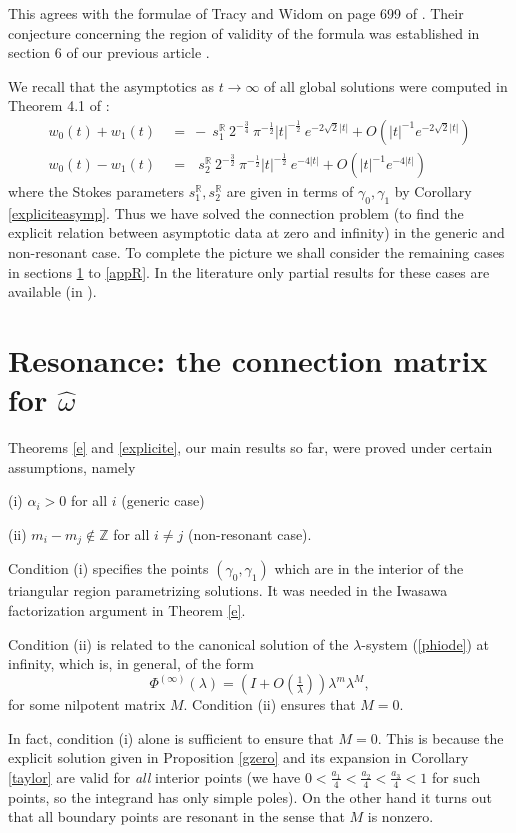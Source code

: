 \documentclass[a4paper,12pt,leqno]{amsart}
\numberwithin{equation}{section}
\theoremstyle{plain}
\theoremstyle{definition}
\newcommand{\R}{\mathbb R}
\newcommand{\Z}{\mathbb Z}
\newcommand{\al}{\alpha}
\newcommand{\ga}{\gamma}
\newcommand{\la}{\lambda}
\newcommand{\om}{\omega}
\newcommand{\no}{\noindent}
\newcommand{\Phii}{\Phi^{(\infty)}}
\newcommand{\nn}{m}
\newcommand{\NN}{M}
\begin{document}
{This agrees with the formulae of  Tracy and Widom on page 699 of \cite{TrWi98}. Their conjecture concerning the region of validity of the formula was established in section 6 of our previous article \cite{GuItLi15}.

We recall that the asymptotics as $t\to\infty$ of all global solutions were computed in
Theorem 4.1 of \cite{GuItLi15}:
\begin{align*}
w_0(t)+w_1(t)\ &=\  -\ s_1^\R\  2^{-\frac34}\  
\pi^{-\frac12} \vert t\vert^{-\frac12} 
\ e^{-2\sqrt2 \vert t\vert }
+ O(\vert t\vert^{-1}e^{-2\sqrt2 \vert t\vert })
\\
w_0(t)-w_1(t)\ &=\  \ \  s_2^\R\  2^{-\frac32}\  
\pi^{-\frac12} \vert t\vert^{-\frac12}
\ e^{-4 \vert t\vert }
+ O(\vert t\vert ^{-1}e^{-4 \vert t\vert })
\end{align*}
where the Stokes parameters $s_1^\R, s_2^\R$ are given in terms of $\ga_0,\ga_1$ by Corollary \ref{expliciteasymp}.
Thus we have solved the connection problem (to find the explicit relation between asymptotic data at zero and infinity) in the generic and non-resonant case. To complete the picture we shall consider the remaining cases in sections
\ref{resD1} to \ref{appR}.   In the literature only partial results for these cases are available (in \cite{Wi08}).

\section{Resonance: the connection matrix for $\hat\om$}\label{resD1}

Theorems \ref{e} and \ref{explicite}, our main results so far, were proved under certain assumptions, namely

(i) $\al_i> 0$ for all $i$ (generic case)

(ii) $\nn_i-\nn_j\notin\Z$ for all $i\ne j$ (non-resonant case).

\no Condition (i) specifies the points $(\ga_0,\ga_1)$ which are in the interior of the triangular region parametrizing solutions.  It was needed in the Iwasawa factorization argument in 
Theorem \ref{e}. 

Condition (ii) is related to the canonical solution of the $\la$-system (\ref{phiode}) at infinity, which is, in general, of the form 
\[
\Phii(\la)=\left(I+O(\tfrac1\la)\right)\la^\nn\la^\NN,
\]
for some nilpotent matrix $\NN$. Condition (ii) ensures that $\NN=0$.  

In fact, condition (i) alone is sufficient to ensure that $\NN=0$.  This is because the  explicit solution given in Proposition \ref{gzero} and its expansion in Corollary \ref{taylor} 
are valid for {\em all} interior points (we have
$0<\tfrac{a_1}4<\tfrac{a_2}4<\tfrac{a_3}4<1$ for such points,
so the integrand has only simple poles). 
On the other hand it turns out that all boundary points are resonant in the sense that $\NN$ is nonzero. 

}
\end{document}
